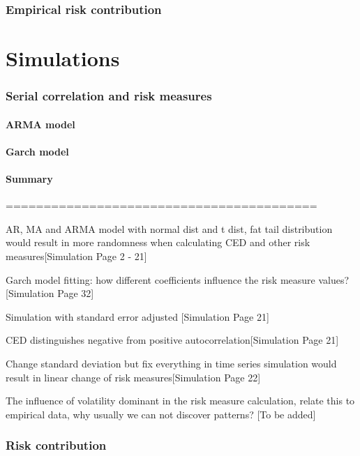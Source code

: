 \documentclass[11pt]{article}
\begin{document}
\section{Empirical risk contribution}


\part{Simulations}

\section{Serial correlation and risk measures}

\subsection{ARMA model}

\subsection{Garch model}

\subsection{Summary}




=========================================

AR, MA and ARMA model with normal dist and t dist, fat tail distribution would result in more randomness when calculating CED and other risk measures[Simulation Page 2 - 21]

Garch model fitting: how different coefficients influence the risk measure values? [Simulation Page 32]

Simulation with standard error adjusted [Simulation Page 21]

CED distinguishes negative from positive autocorrelation[Simulation Page 21]

Change standard deviation but fix everything in time series simulation would result in linear change of risk measures[Simulation Page 22]

The influence of volatility dominant in the risk measure calculation, relate this to empirical data, why usually we can not discover patterns? [To be added] 


\section{Risk contribution}
\end{document}

